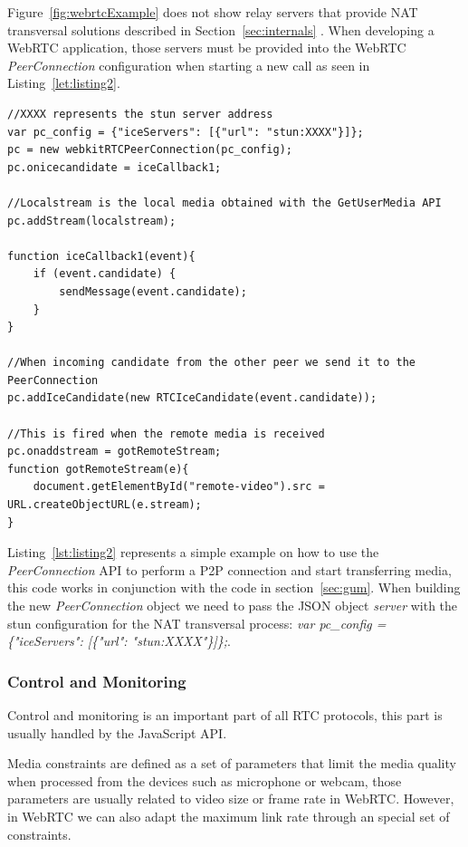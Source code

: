 Figure~\ref{fig:webrtcExample} does not show relay servers that provide NAT transversal solutions described in Section~\ref{sec:internals} . When developing a WebRTC application, those servers must be provided into the WebRTC {\it PeerConnection} configuration when starting a new call as seen in Listing~\ref{let:listing2}.

\lstset{language=JavaScript}
\begin{lstlisting}[caption=Simple example of {\it PeerConnection} using JavaScript,label={lst:listing2}]
//XXXX represents the stun server address
var pc_config = {"iceServers": [{"url": "stun:XXXX"}]};
pc = new webkitRTCPeerConnection(pc_config);
pc.onicecandidate = iceCallback1;

//Localstream is the local media obtained with the GetUserMedia API
pc.addStream(localstream);

function iceCallback1(event){
	if (event.candidate) {
		sendMessage(event.candidate);
	}
}

//When incoming candidate from the other peer we send it to the PeerConnection
pc.addIceCandidate(new RTCIceCandidate(event.candidate));

//This is fired when the remote media is received
pc.onaddstream = gotRemoteStream; 
function gotRemoteStream(e){
	document.getElementById("remote-video").src = URL.createObjectURL(e.stream);
}
\end{lstlisting}

Listing~\ref{lst:listing2} represents a simple example on how to use the {\it PeerConnection} API to perform a P2P connection and start transferring media, this code works in conjunction with the code in section~\ref{sec:gum}. When building the new {\it PeerConnection} object we need to pass the JSON object {\it server} with the stun configuration for the NAT transversal process: {\it var pc\_config = \{"iceServers": [\{"url": "stun:XXXX"\}]\};}. 

\subsubsection{Control and Monitoring}
\label{sec:constraints}

Control and monitoring is an important part of all RTC protocols, this part is usually handled by the JavaScript API.

Media constraints are defined as a set of parameters that limit the media quality when processed from the devices such as microphone or webcam, those parameters are usually related to video size or frame rate in WebRTC. However, in WebRTC we can also adapt the maximum link rate through an special set of constraints.

